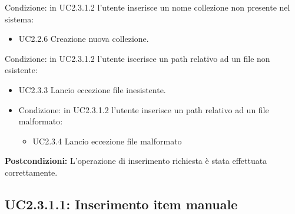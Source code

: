 \documentclass{scalatekids-article}
\begin{document}
\item Condizione: in UC2.3.1.2 l'utente inserisce un nome collezione non presente nel sistema:
  \begin{itemize}
  \item UC2.2.6 Creazione nuova collezione.
  \end{itemize}
\item Condizione: in UC2.3.1.2 l'utente iscerisce un path relativo ad un file non esistente:
  \begin{itemize}
  \item UC2.3.3 Lancio eccezione file inesistente.
\item Condizione: in UC2.3.1.2 l'utente inserisce un path relativo ad un file malformato: %
  \begin{itemize}
  \item UC2.3.4 Lancio eccezione file malformato
  \end{itemize}
\end{itemize}
\textbf{Postcondizioni:} L'operazione di inserimento richiesta è stata effettuata correttamente.

\subsection{UC2.3.1.1: Inserimento item manuale}
\end{document}

